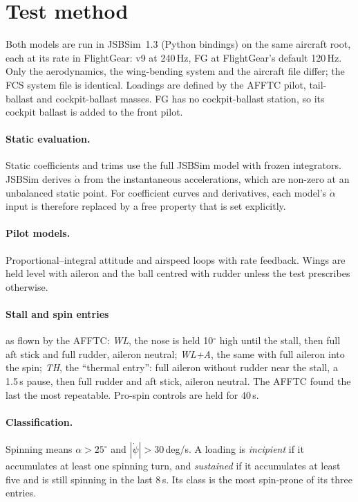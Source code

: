 \documentclass[10pt,a4paper,twocolumn]{article}
\newcommand{\vnine}{v9}
\newcommand{\FG}{FG}
\begin{document}
\section{Test method}\label{sec:method}
Both models are run in JSBSim~1.3 (Python bindings) on the same aircraft root, each at its rate in FlightGear: \vnine{} at
240\,Hz, \FG{} at FlightGear's default 120\,Hz. Only the aerodynamics, the wing-bending system and the aircraft file differ; the FCS
system file is identical. Loadings are defined by the AFFTC pilot, tail-ballast and
cockpit-ballast masses. \FG{} has no cockpit-ballast station, so its cockpit ballast is added to the front pilot.

\paragraph{Static evaluation.} Static coefficients and trims use the full JSBSim model with frozen integrators. JSBSim derives
$\dot\alpha$ from the instantaneous accelerations, which are non-zero at an unbalanced static point. For coefficient curves and
derivatives, each model's $\dot\alpha$ input is therefore replaced by a free property that is set explicitly.
\paragraph{Pilot models.} Proportional--integral attitude and airspeed loops with rate feedback. Wings are held level with
aileron and the ball centred with rudder unless the test prescribes otherwise.
\paragraph{Stall and spin entries} as flown by the AFFTC:
\emph{WL}, the nose is held 10$^\circ$ high until the stall, then full aft stick and full rudder, aileron neutral;
\emph{WL+A}, the same with full aileron into the spin;
\emph{TH}, the ``thermal entry'': full aileron without rudder near the stall, a 1.5\,s pause, then full rudder and aft stick, aileron neutral.
The AFFTC found the last the most repeatable. Pro-spin controls are held for 40\,s.
\paragraph{Classification.} Spinning means $\alpha>25^\circ$ and $|\dot\psi|>30$\,deg/s. A loading is \emph{incipient} if it
accumulates at least one spinning turn, and \emph{sustained} if it accumulates at least five and is still spinning in the last 8\,s.
Its class is the most spin-prone of its three entries.
\end{document}
